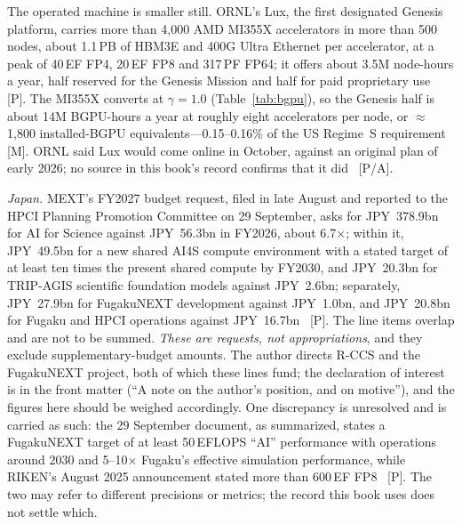 The operated machine is smaller still. ORNL's Lux, the first designated Genesis platform, carries more than 4,000 AMD MI355X accelerators in more than 500 nodes, about 1.1\,PB of HBM3E and 400G Ultra Ethernet per accelerator, at a peak of 40\,EF FP4, 20\,EF FP8 and 317\,PF FP64; it offers about 3.5M node-hours a year, half reserved for the Genesis Mission and half for paid proprietary use~\cite{sci-ornl-lux} [P]. The MI355X converts at $\gamma = 1.0$ (Table~\ref{tab:bgpu}), so the Genesis half is about 14M BGPU-hours a year at roughly eight accelerators per node, or $\approx$1,800 installed-BGPU equivalents---0.15--0.16\% of the US Regime~S requirement [M]. ORNL said Lux would come online in October, against an original plan of early 2026; no source in this book's record confirms that it did~\cite{sci-ornl-lux,sci-lux-delay} [P/A].

\emph{Japan.} MEXT's FY2027 budget request, filed in late August and reported to the HPCI Planning Promotion Committee on 29 September, asks for JPY~378.9bn for AI for Science against JPY~56.3bn in FY2026, about 6.7$\times$; within it, JPY~49.5bn for a new shared AI4S compute environment with a stated target of at least ten times the present shared compute by FY2030, and JPY~20.3bn for TRIP-AGIS scientific foundation models against JPY~2.6bn; separately, JPY~27.9bn for FugakuNEXT development against JPY~1.0bn, and JPY~20.8bn for Fugaku and HPCI operations against JPY~16.7bn~\cite{gov-mext-fy2027} [P]. The line items overlap and are not to be summed. \emph{These are requests, not appropriations}, and they exclude supplementary-budget amounts. The author directs R-CCS and the FugakuNEXT project, both of which these lines fund; the declaration of interest is in the front matter (``A note on the author's position, and on motive''), and the figures here should be weighed accordingly. One discrepancy is unresolved and is carried as such: the 29 September document, as summarized, states a FugakuNEXT target of at least 50\,EFLOPS ``AI'' performance with operations around 2030 and 5--10$\times$ Fugaku's effective simulation performance, while RIKEN's August 2025 announcement stated more than 600\,EF FP8~\cite{gov-mext-fy2027,fugakunext} [P]. The two may refer to different precisions or metrics; the record this book uses does not settle which.

